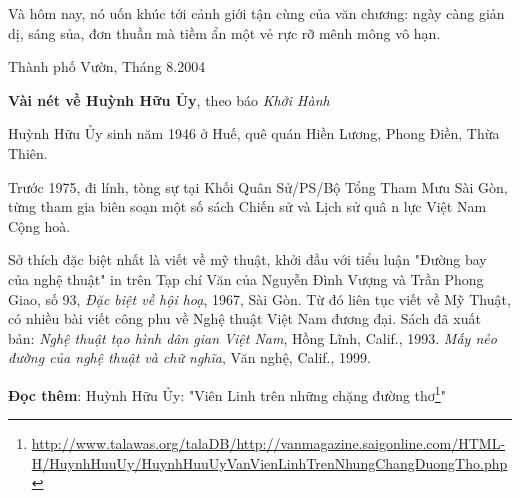 \documentclass[../main.tex]{subfiles}
\begin{document}
\begin{multicols}{2}
Và hôm nay, nó uốn khúc tới cảnh giới tận cùng của văn chương: ngày càng giản dị, sáng sủa, đơn thuần mà tiềm ẩn một vẻ rực rỡ mênh mông vô hạn. 

Thành phố Vườn, 
Tháng 8.2004 


\textbf{Vài nét về Huỳnh Hữu Ủy}, theo báo \textit{Khởi Hành} 

Huỳnh Hữu Ủy sinh năm 1946 ở Huế, quê quán Hiền Lương, Phong Điền, Thừa Thiên. 

Trước 1975, đi lính, tòng sự tại Khối Quân Sử/PS/Bộ Tổng Tham Mưu Sài Gòn, từng tham gia biên soạn một số sách Chiến sử và Lịch sử quâ n lực Việt Nam Cộng hoà. 

Sở thích đặc biệt nhất là viết về mỹ thuật, khởi đầu với tiểu luận "Đường bay của nghệ thuật" in trên Tạp chí Văn của Nguyễn Đình Vượng và Trần Phong Giao, số 93, \textit{Đặc biệt về hội hoạ}, 1967, Sài Gòn. Từ đó liên tục viết về Mỹ Thuật, có nhiều bài viết công phu về Nghệ thuật Việt Nam đương đại. Sách đã xuất bản: \textit{Nghệ thuật tạo hình dân gian Việt Nam}, Hồng Lĩnh, Calif., 1993. \textit{Mấy nẻo đường của nghệ thuật và chữ nghĩa}, Văn nghệ, Calif., 1999. 


\textbf{Đọc thêm}: Huỳnh Hữu Ủy: "Viên Linh trên những chặng đường thơ\footnote{\url{http://www.talawas.org/talaDB/http://vanmagazine.saigonline.com/HTML-H/HuynhHuuUy/HuynhHuuUyVanVienLinhTrenNhungChangDuongTho.php}}" 




\end{multicols}
\end{document}
